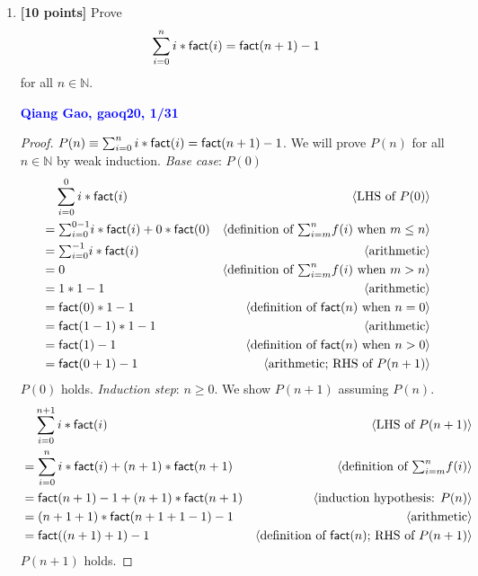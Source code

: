 \documentclass[11pt,fleqn]{article}
\newcommand{\mname}[1]{\mbox{\sf #1}}
\newcommand{\pnote}[1]{{\langle \text{#1} \rangle}}
\begin{document}
\begin{enumerate}

  \item \textbf{[10 points]} Prove \[\sum^{n}_{i = 0} i *
    \mname{fact}(i) = \mname{fact}(n+1) - 1\] for all $n \in
    \mathbb{N}$.

  

  \textcolor{blue}{\textbf{Qiang Gao, gaoq20, 1/31}}

\begin{proof}
$P(n) \equiv \sum^{n}_{i=0}i*\mname{fact}(i) =\mname{fact}(n+1)-1$. We will prove $P(n)$
for all $n \in \mathbb{N}$ by weak induction.
\medskip
\emph{Base case}: $P(0)$
\begin{align*}
  &\phantom{{}=} \sum_{i=0}^{0}i*\mname{fact}(i) & \pnote{LHS of $P(0)$}\\
  &= \textstyle{\sum}_{i=0}^{0-1} i*\mname{fact}(i) + 0*\mname{fact}(0) & \pnote{definition of $\textstyle{\sum}_{i=m}^{n} f(i)$ when $m \le n$}\\
  &= \textstyle{\sum}_{i=0}^{-1} i*\mname{fact}(i)         & \pnote{arithmetic}\\
  &= 0      & \pnote{definition of $\textstyle{\sum}_{i=m}^{n} f(i)$ when $m > n$}\\
  &=1*1-1 	& \pnote{arithmetic}\\
  &=\mname{fact}(0)*1-1	& \pnote{definition of $\mname{fact}(n)$ when $n = 0$}\\
  &=\mname{fact}(1-1)*1-1	& \pnote{arithmetic}\\
  &=\mname{fact}(1)-1	& \pnote{definition of $\mname{fact}(n)$ when $n > 0$}\\
  &=\mname{fact}(0+1)-1	& \pnote{arithmetic; RHS of $P(n + 1)$}
\end{align*}
$P(0)$ holds.
\medskip
\emph{Induction step}: $n \ge 0$. We show $P(n + 1)$ assuming $P(n)$.
\begin{align*}
  &\phantom{{}=} \sum_{i=0}^{n + 1} i*\mname{fact}(i)   & \pnote{LHS of $P(n + 1)$}\\
  &= \sum_{i=0}^{n} i*\mname{fact}(i)  + (n+1)*\mname{fact}(n+1)     & \pnote{definition of $\textstyle{\sum}_{i=m}^{n} f(i)$}\\
  &= \mname{fact}(n+1) - 1 + (n+1)*\mname{fact}(n+1) & \pnote{induction hypothesis: $P(n)$}\\
  &= (n+1+1)*\mname{fact}(n+1+1-1) - 1          & \pnote{arithmetic}\\
  &=  \mname{fact}((n+1)+1) - 1            & \pnote{definition of $\mname{fact}(n)$; RHS of $P(n + 1)$}
\end{align*}
$P(n + 1)$ holds.
\medskip


\end{proof}
\end{enumerate}
\end{document}
